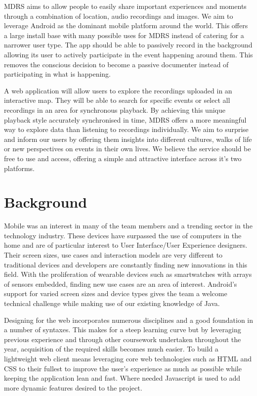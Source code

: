 \documentclass{l3proj}
\begin{document}
MDRS aims to allow people to easily share important experiences and moments through a combination of location, audio recordings and images. We aim to leverage Android as the dominant mobile platform around the world. This offers a large install base with many possible uses for MDRS instead of catering for a narrower user type. The app should be able to passively record in the background allowing its user to actively participate in the event happening around them. This removes the conscious decision to become a passive documenter instead of participating in what is happening.

A web application will allow users to explore the recordings uploaded in an interactive map. They will be able to search for specific events or select all recordings in an area for synchronous playback. By achieving this unique playback style accurately synchronised in time, MDRS offers a more meaningful way to explore data than listening to recordings individually. We aim to surprise and inform our users by offering them insights into different cultures, walks of life or new perspectives on events in their own lives. We believe the service should be free to use and access, offering a simple and attractive interface across it's two platforms.

\section{Background}
Mobile was an interest in many of the team members and a trending sector in the technology industry. These devices have surpassed the use of computers in the home and are of particular interest to User Interface/User Experience designers. Their screen sizes, use cases and interaction models are very different to traditional devices and developers are constantly finding new innovations in this field. With the proliferation of wearable devices such as smartwatches with arrays of sensors embedded, finding new use cases are an area of interest.  Android’s support for varied screen sizes and device types gives the team a welcome technical challenge while making use of our existing knowledge of Java.

Designing for the web incorporates numerous disciplines and a good foundation in a number of syntaxes. This makes for a steep learning curve but by leveraging previous experience and through other coursework undertaken throughout the year, acquisition of the required skills becomes much easier. To build a lightweight web client means leveraging core web technologies such as HTML and CSS to their fullest to improve the user’s experience as much as possible while keeping the application lean and fast. Where needed Javascript is used to add more dynamic features desired to the project.
\end{document}
